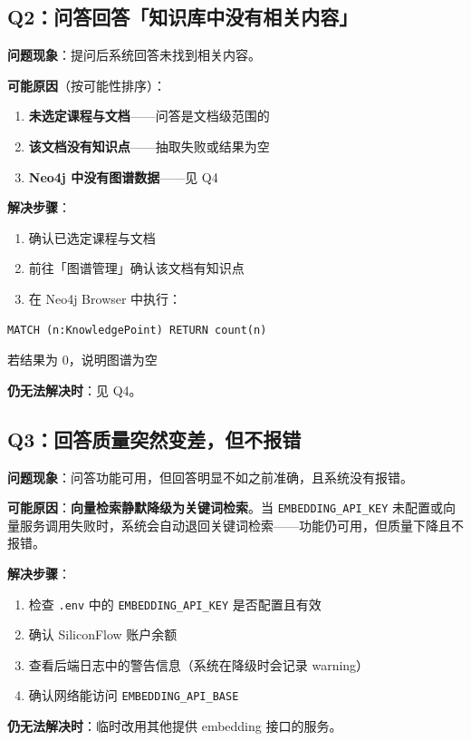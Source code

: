 \documentclass[UTF8,a4paper,11pt]{ctexrep}
\begin{document}
\subsection{Q2：问答回答「知识库中没有相关内容」}

\textbf{问题现象}：提问后系统回答未找到相关内容。

\textbf{可能原因}（按可能性排序）：

\begin{enumerate}
\item \textbf{未选定课程与文档}——问答是文档级范围的
\item \textbf{该文档没有知识点}——抽取失败或结果为空
\item \textbf{Neo4j 中没有图谱数据}——见 Q4
\end{enumerate}
\textbf{解决步骤}：

\begin{enumerate}
\item 确认已选定课程与文档
\item 前往「图谱管理」确认该文档有知识点
\item 在 Neo4j Browser 中执行：
\end{enumerate}
\begin{Verbatim}[breaklines=true,breakanywhere=true,fontsize=\small,frame=single,framesep=4pt,rulecolor=\color{codeframe}]
   MATCH (n:KnowledgePoint) RETURN count(n)
\end{Verbatim}

若结果为 0，说明图谱为空

\textbf{仍无法解决时}：见 Q4。


\subsection{Q3：回答质量突然变差，但不报错}

\textbf{问题现象}：问答功能可用，但回答明显不如之前准确，且系统没有报错。

\textbf{可能原因}：\textbf{向量检索静默降级为关键词检索}。当 \texttt{EMBEDDING\_API\_KEY} 未配置或向量服务调用失败时，系统会自动退回关键词检索——功能仍可用，但质量下降且不报错。

\textbf{解决步骤}：

\begin{enumerate}
\item 检查 \texttt{.env} 中的 \texttt{EMBEDDING\_API\_KEY} 是否配置且有效
\item 确认 SiliconFlow 账户余额
\item 查看后端日志中的警告信息（系统在降级时会记录 warning）
\item 确认网络能访问 \texttt{EMBEDDING\_API\_BASE}
\end{enumerate}
\textbf{仍无法解决时}：临时改用其他提供 embedding 接口的服务。
\end{document}
